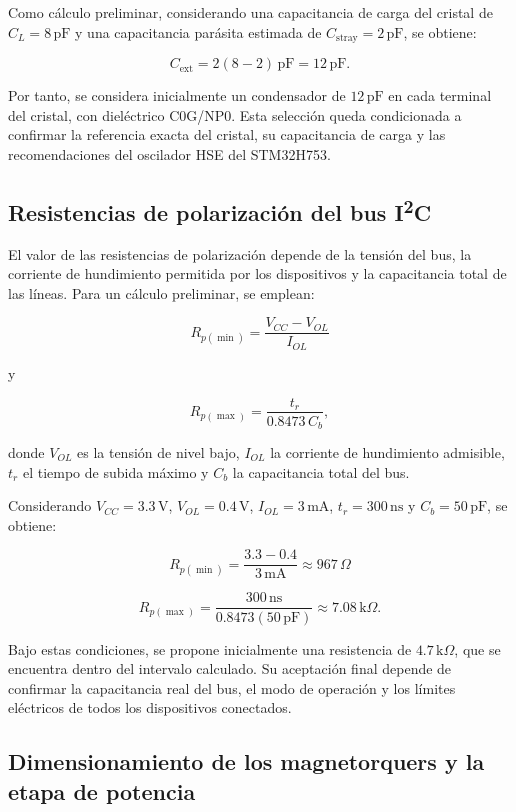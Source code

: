 \documentclass[11pt,a4paper]{article}
\begin{document}
Como cálculo preliminar, considerando una capacitancia de carga
del cristal de \(C_L=8\,\mathrm{pF}\) y una capacitancia parásita
estimada de \(C_{\mathrm{stray}}=2\,\mathrm{pF}\), se obtiene:

\[
C_{\mathrm{ext}}=2(8-2)\,\mathrm{pF}
=12\,\mathrm{pF}.
\]

Por tanto, se considera inicialmente un condensador de \(12\,\mathrm{pF}\)
en cada terminal del cristal, con dieléctrico C0G/NP0. Esta selección
queda condicionada a confirmar la referencia exacta del cristal,
su capacitancia de carga y las recomendaciones del oscilador HSE
del STM32H753.

\subsection{Resistencias de polarización del bus I\textsuperscript{2}C}

El valor de las resistencias de polarización depende de la tensión
del bus, la corriente de hundimiento permitida por los dispositivos
y la capacitancia total de las líneas. Para un cálculo preliminar,
se emplean:

\[
R_{p(\min)}=\frac{V_{CC}-V_{OL}}{I_{OL}}
\]

y

\[
R_{p(\max)}=\frac{t_r}{0.8473\,C_b},
\]

donde \(V_{OL}\) es la tensión de nivel bajo, \(I_{OL}\) la corriente
de hundimiento admisible, \(t_r\) el tiempo de subida máximo y
\(C_b\) la capacitancia total del bus.

Considerando \(V_{CC}=3.3\,\mathrm{V}\), \(V_{OL}=0.4\,\mathrm{V}\),
\(I_{OL}=3\,\mathrm{mA}\), \(t_r=300\,\mathrm{ns}\) y
\(C_b=50\,\mathrm{pF}\), se obtiene:

\[
R_{p(\min)}=
\frac{3.3-0.4}{3\,\mathrm{mA}}
\approx 967\,\Omega
\]

\[
R_{p(\max)}=
\frac{300\,\mathrm{ns}}
{0.8473(50\,\mathrm{pF})}
\approx 7.08\,\mathrm{k}\Omega.
\]

Bajo estas condiciones, se propone inicialmente una resistencia
de \(4.7\,\mathrm{k}\Omega\), que se encuentra dentro del intervalo
calculado. Su aceptación final depende de confirmar la capacitancia
real del bus, el modo de operación y los límites eléctricos de
todos los dispositivos conectados.

\subsection{Dimensionamiento de los magnetorquers y la etapa de potencia}
\end{document}

